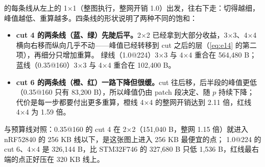 \documentclass[11pt,a4paper]{ctexart}
\begin{document}
的每条线从左上的 1×1（整图执行，整网开销 1.0）出发，往右下走：切得越细，峰值越低、重算越多。四条线的形状说明了两种不同的饱和：
\begin{itemize}
  \item \textbf{cut 4 的两条线（蓝、绿）先陡后平。}2×2 已经拿到大部分收益，3×3、4×4 横向右移而纵向几乎不动——峰值已经转移到 cut 之后的层（\cref{eq:e14} 的第二项），再细分只增加重算。
        绿线（1.0@224）3×3 与 4×4 重合在 564,480 B；蓝线（0.35@160）3×3 与 4×4 重合在 102,400 B。
  \item \textbf{cut 6 的两条线（橙、红）一路下降但很缓。}cut 往后移，后半段的峰值更低（0.35@160 只有 83,200 B），所以峰值仍由 patch 段决定、随 $p$ 持续下降；
        代价是每一步都要付出更多重算，橙线 4×4 的整网开销达到 2.11 倍，红线 4×4 为 1.59 倍。
\end{itemize}
与预算线对照：0.35@160 的 cut 4 在 2×2（151,040 B，整网 1.15 倍）就进入 nRF52840 的 256 KB 线以下，是这张图上进入 256 KB 最便宜的点；
1.0@224 的 cut 6、4×4 是 326,144 B，比 STM32F746 的 327,680 B 只低 1,536 B，红线最右端的点正好压在 320 KB 线上。
\end{document}

